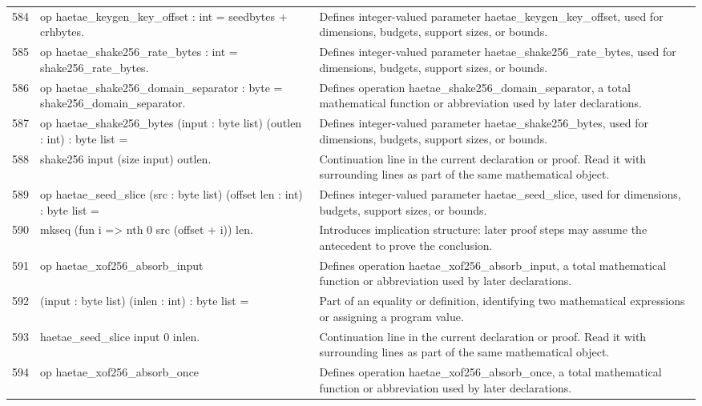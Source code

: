 \documentclass[10pt]{article}
\begin{document}
\begin{longtable}{r L{0.53\textwidth} L{0.37\textwidth}}
584 & {\ttfamily\scriptsize op haetae\_keygen\_key\_offset : int = seedbytes + crhbytes.} & Defines integer-valued parameter haetae\_keygen\_key\_offset, used for dimensions, budgets, support sizes, or bounds. \\
585 & {\ttfamily\scriptsize op haetae\_shake256\_rate\_bytes : int = shake256\_rate\_bytes.} & Defines integer-valued parameter haetae\_shake256\_rate\_bytes, used for dimensions, budgets, support sizes, or bounds. \\
586 & {\ttfamily\scriptsize op haetae\_shake256\_domain\_separator : byte = shake256\_domain\_separator.} & Defines operation haetae\_shake256\_domain\_separator, a total mathematical function or abbreviation used by later declarations. \\
587 & {\ttfamily\scriptsize op haetae\_shake256\_bytes (input : byte list) (outlen : int) : byte list =} & Defines integer-valued parameter haetae\_shake256\_bytes, used for dimensions, budgets, support sizes, or bounds. \\
588 & {\ttfamily\scriptsize   shake256 input (size input) outlen.} & Continuation line in the current declaration or proof.  Read it with surrounding lines as part of the same mathematical object. \\
589 & {\ttfamily\scriptsize op haetae\_seed\_slice (src : byte list) (offset len : int) : byte list =} & Defines integer-valued parameter haetae\_seed\_slice, used for dimensions, budgets, support sizes, or bounds. \\
590 & {\ttfamily\scriptsize   mkseq (fun i => nth 0 src (offset + i)) len.} & Introduces implication structure: later proof steps may assume the antecedent to prove the conclusion. \\
591 & {\ttfamily\scriptsize op haetae\_xof256\_absorb\_input} & Defines operation haetae\_xof256\_absorb\_input, a total mathematical function or abbreviation used by later declarations. \\
592 & {\ttfamily\scriptsize    (input : byte list) (inlen : int) : byte list =} & Part of an equality or definition, identifying two mathematical expressions or assigning a program value. \\
593 & {\ttfamily\scriptsize   haetae\_seed\_slice input 0 inlen.} & Continuation line in the current declaration or proof.  Read it with surrounding lines as part of the same mathematical object. \\
594 & {\ttfamily\scriptsize op haetae\_xof256\_absorb\_once} & Defines operation haetae\_xof256\_absorb\_once, a total mathematical function or abbreviation used by later declarations. \\

\end{longtable}
\end{document}
